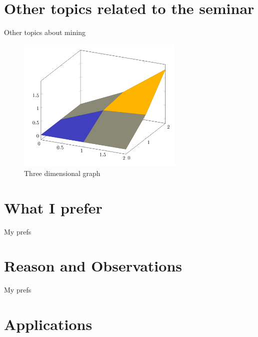 \documentclass[12pt]{book}
\begin{document}
\chapter{Other topics related to the seminar}
Other topics about mining
\begin{figure}
\centering
\includegraphics[width=8cm]{Pgfplot3d3}
\caption{Three dimensional graph}
\label{fig:figure1}
\end{figure}


\chapter{What I prefer}
My prefs

\chapter{Reason and Observations}
My prefs

\chapter{Applications}
\end{document}
